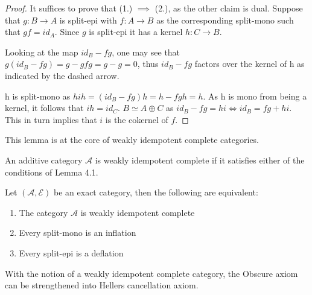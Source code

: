     \begin{proof}
        It suffices to prove that (1.) $\implies$ (2.), as the other claim is dual. Suppose that $g:B\rightarrow A$ is split-epi with $f:A\rightarrow B$ as the corresponding split-mono such that $gf=id_A$. Since $g$ is split-epi it has a kernel $h:C\rightarrow B$.
        
        \begin{center}
        \end{center}

        Looking at the map $id_B-fg$, one may see that $g(id_B-fg)=g-gfg=g-g=0$, thus $id_B-fg$ factors over the kernel of h as indicated by the dashed arrow.

        h is split-mono as $hih = (id_B-fg)h=h-fgh=h$. As h is mono from being a kernel, it follows that $ih=id_C$.  $B\simeq A\oplus C$ as $id_B -fg = hi \iff id_B = fg + hi$. This in turn implies that $i$ is the cokernel of $f$.
    \end{proof}

    This lemma is at the core of weakly idempotent complete categories.

    \begin{definition}
        An additive category $\mathcal{A}$ is weakly idempotent complete if it satisfies either of the conditions of Lemma 4.1.
    \end{definition}

    \begin{corollary}
        Let $(\mathcal{A},\mathcal{E})$ be an exact category, then the following are equivalent:
        \begin{enumerate}
            \item The category $\mathcal{A}$ is weakly idempotent complete
            \item Every split-mono is an inflation
            \item Every split-epi is a deflation
        \end{enumerate}
    \end{corollary}

    With the notion of a weakly idempotent complete category, the Obscure axiom can be strengthened into Hellers cancellation axiom.


